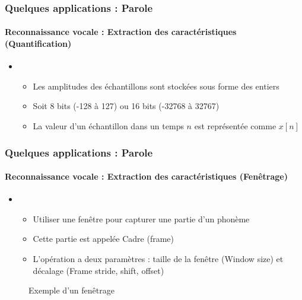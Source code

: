 \documentclass[xcolor=table]{beamer}
\begin{document}
\begin{frame}
	\frametitle{Quelques applications : Parole}
	\framesubtitle{Reconnaissance vocale : Extraction des caractéristiques (Quantification)}
	\begin{itemize}
		\item {}
		\begin{itemize}
			\item Les amplitudes des échantillons sont stockées sous forme des entiers
			\item Soit 8 bits (-128 à 127) ou 16 bits (-32768 à 32767)
			\item La valeur d'un échantillon dans un temps $n$ est représentée comme $x[n]$
		\end{itemize}
	\end{itemize}
\end{frame}

\begin{frame}
	\frametitle{Quelques applications : Parole}
	\framesubtitle{Reconnaissance vocale : Extraction des caractéristiques (Fenêtrage)}
	\begin{itemize}
		\item {}
		\begin{itemize}
			\item Utiliser une fenêtre pour capturer une partie d'un phonème 
			\item Cette partie est appelée Cadre (frame)
			\item L'opération a deux paramètres : taille de la fenêtre (Window size) et décalage (Frame stride, shift, offset)
		\end{itemize}
	\end{itemize}
	\begin{figure}
		\centering
		\caption{Exemple d'un fenêtrage \cite{2020-jurafsky-martin}}
	\end{figure}
\end{frame}
\end{document}
